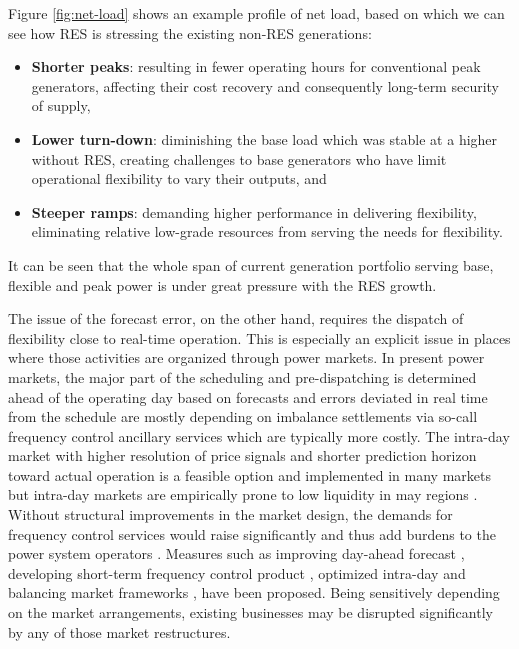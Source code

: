 Figure \ref{fig:net-load} shows an example profile of net load, based on which we can see how RES is stressing the existing non-RES generations:

\begin{itemize}
	\item \textbf{Shorter peaks}: resulting in fewer operating hours for conventional peak generators, affecting their cost recovery and consequently long-term security of supply,
	\item \textbf{Lower turn-down}: diminishing the base load which was stable at a higher without RES, creating challenges to base generators who have limit operational flexibility to vary their outputs, and
	\item \textbf{Steeper ramps}: demanding higher performance in delivering flexibility, eliminating relative low-grade resources from serving the needs for flexibility.
\end{itemize}

It can be seen that the whole span of current generation portfolio serving base, flexible and peak power is under great pressure with the RES growth.

The issue of the forecast error, on the other hand, requires the dispatch of flexibility close to real-time operation. This is especially an explicit issue in places where those activities are organized through power markets. In present power markets, the major part of the scheduling and pre-dispatching is determined ahead of the operating day based on forecasts and errors deviated in real time from the schedule are mostly depending on imbalance settlements via so-call frequency control ancillary services which are typically more costly\cite{Ranci2013,Srivastava2011}. The intra-day market with higher resolution of price signals and shorter prediction horizon toward actual operation is a feasible option and implemented in many markets\cite{Srivastava2011} but intra-day markets are empirically prone to low liquidity in may regions \cite{Lund2015, Hagemann2015,Weber2010}. Without structural improvements in the market design, the demands for frequency control services would raise significantly and thus add burdens to the power system operators \cite{GEEnergyConsulting2014,Krad2017,Koch2009}. Measures such as improving day-ahead forecast \cite{Woo2016}, developing short-term frequency control product \cite{Gonzalez-Aparicio2015}, optimized intra-day \cite{Weber2010} and balancing market frameworks \cite{Wartsila2014}, have been proposed. Being sensitively depending on the market arrangements, existing businesses may be disrupted significantly by any of those market restructures.

